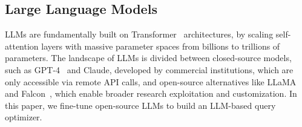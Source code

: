 \subsection{Large Language Models}
LLMs are fundamentally built on Transformer~\cite{DBLP:conf/nips/VaswaniSPUJGKP17} architectures, by scaling self-attention layers with massive parameter spaces from billions to trillions of parameters.
The landscape of LLMs is divided between closed-source models, such as GPT-4~\cite{DBLP:journals/corr/abs-2303-08774} and Claude, developed by commercial institutions, which are only accessible via remote API calls, and open-source alternatives like LLaMA~\cite{DBLP:journals/corr/abs-2302-13971} and Falcon~\cite{DBLP:conf/nips/PenedoMHCACPAL23}, which enable broader research exploitation and customization.  
In this paper, we fine-tune open-source LLMs to build an LLM-based query optimizer. 

